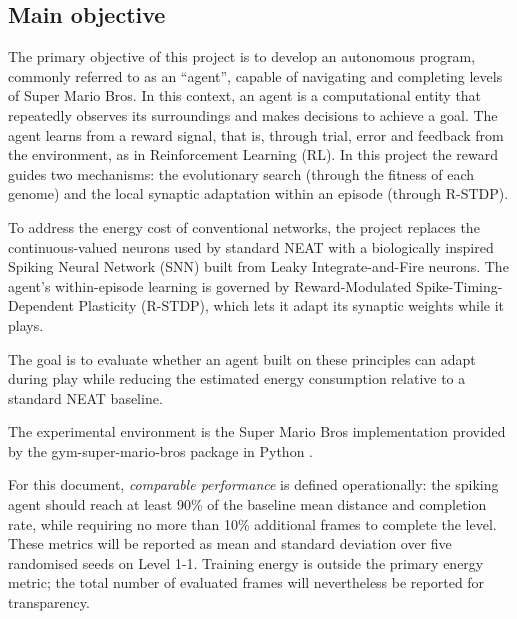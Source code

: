\subsection{Main objective}
\label{sec:objectives-main}
The primary objective of this project is to develop an autonomous program, commonly referred to as an ``agent'', capable of navigating and completing levels of Super Mario Bros. In this context, an agent is a computational entity that repeatedly observes its surroundings and makes decisions to achieve a goal. The agent learns from a reward signal, that is, through trial, error and feedback from the environment, as in Reinforcement Learning (RL). In this project the reward guides two mechanisms: the evolutionary search (through the fitness of each genome) and the local synaptic adaptation within an episode (through R-STDP).

To address the energy cost of conventional networks, the project replaces the continuous-valued neurons used by standard NEAT with a biologically inspired Spiking Neural Network (SNN) built from Leaky Integrate-and-Fire neurons. The agent's within-episode learning is governed by Reward-Modulated Spike-Timing-Dependent Plasticity (R-STDP), which lets it adapt its synaptic weights while it plays.

The goal is to evaluate whether an agent built on these principles can adapt during play while reducing the estimated energy consumption relative to a standard NEAT baseline.

The experimental environment is the Super Mario Bros implementation provided by the gym-super-mario-bros package in Python \cite{gym_super_mario_bros}.

For this document, \emph{comparable performance} is defined operationally: the spiking agent should reach at least 90\% of the baseline mean distance and completion rate, while requiring no more than 10\% additional frames to complete the level. These metrics will be reported as mean and standard deviation over five randomised seeds on Level 1-1. Training energy is outside the primary energy metric; the total number of evaluated frames will nevertheless be reported for transparency.

